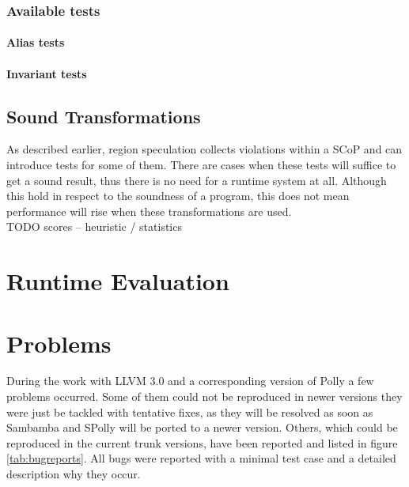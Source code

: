 \red
\begin{shaded}
\subsubsection{Available tests}

\paragraph{Alias tests}


\paragraph{Invariant tests}




\subsection{Sound Transformations}
\label{soundCTtransformations}
As described earlier, region speculation collects violations within a SCoP 
and can introduce tests for some of them. There are cases when these tests will
suffice to get a sound result, thus there is no need for a runtime system at all.
Although this hold in respect to the soundness of a program, this does not mean 
performance will rise when these transformations are used.  \\
TODO scores -- heuristic / statistics 


\section{Runtime Evaluation}


\section{Problems}
During the work with LLVM 3.0 and a corresponding version of Polly a few
problems occurred. Some of them could not be reproduced in newer versions
they were just be tackled with tentative fixes, as they will be resolved as soon
as Sambamba and SPolly will be ported to a newer version.
Others, which could be reproduced in the current trunk versions,
have been reported and listed in figure \ref{tab:bugreports}. All bugs were 
reported with a minimal test case and a detailed description why they occur.

\end{shaded}

